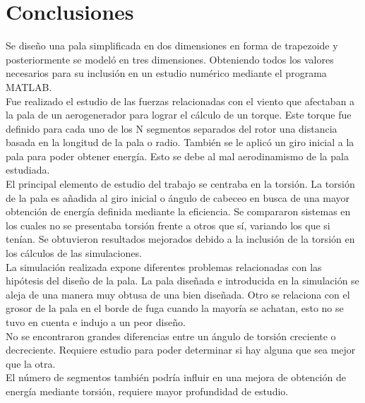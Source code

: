 \section{Conclusiones}

Se diseño una pala simplificada en dos dimensiones en forma de trapezoide y posteriormente se modeló en tres dimensiones. Obteniendo todos los valores necesarios para su inclusión en un estudio numérico mediante el programa MATLAB.\\

Fue realizado el estudio de las fuerzas relacionadas con el viento que afectaban a la pala de un aerogenerador para lograr el cálculo de un torque. Este torque fue definido para cada uno de los N segmentos separados del rotor una distancia basada en la longitud de la pala o radio. También se le aplicó un giro inicial a la pala para poder obtener energía. Esto se debe al mal aerodinamismo de la pala estudiada.\\

El principal elemento de estudio del trabajo se centraba en la torsión. La torsión de la pala es añadida al giro inicial o ángulo de cabeceo en busca de una mayor obtención de energía definida mediante la eficiencia. Se compararon sistemas en los cuales no se presentaba torsión frente a otros que sí, variando los que si tenían. Se obtuvieron resultados mejorados debido a la inclusión de la torsión en los cálculos de las simulaciones.\\

La simulación realizada expone diferentes problemas relacionadas con las hipótesis del diseño de la pala. La pala diseñada e introducida en la simulación se aleja de una manera muy obtusa de una bien diseñada. Otro se relaciona con el grosor de la pala en el borde de fuga cuando la mayoría se achatan, esto no se tuvo en cuenta e indujo a un peor diseño.\\

No se encontraron grandes diferencias entre un ángulo de torsión creciente o decreciente. Requiere estudio para poder determinar si hay alguna que sea mejor que la otra.\\

El número de segmentos también podría influir en una mejora de obtención de energía mediante torsión, requiere mayor profundidad de estudio.
